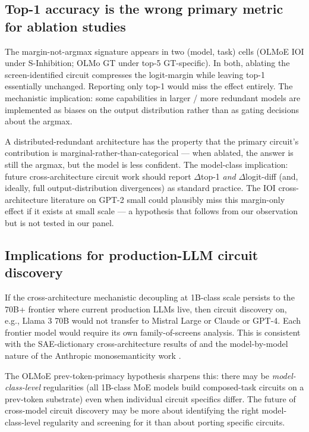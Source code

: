 \documentclass[11pt]{article}
\begin{document}
\subsection{Top-1 accuracy is the wrong primary metric for ablation studies}

The margin-not-argmax signature appears in two (model, task) cells (OLMoE IOI under S-Inhibition; OLMo GT under top-5 GT-specific). In both, ablating the screen-identified circuit compresses the logit-margin while leaving top-1 essentially unchanged. Reporting only top-1 would miss the effect entirely. The mechanistic implication: some capabilities in larger / more redundant models are implemented as biases on the output distribution rather than as gating decisions about the argmax.

A distributed-redundant architecture has the property that the primary circuit's contribution is marginal-rather-than-categorical --- when ablated, the answer is still the argmax, but the model is less confident. The model-class implication: future cross-architecture circuit work should report $\Delta$top-1 \emph{and} $\Delta$logit-diff (and, ideally, full output-distribution divergences) as standard practice. The IOI cross-architecture literature on GPT-2 small could plausibly miss this margin-only effect if it exists at small scale --- a hypothesis that follows from our observation but is not tested in our panel.

\subsection{Implications for production-LLM circuit discovery}

If the cross-architecture mechanistic decoupling at 1B-class scale persists to the 70B+ frontier where current production LLMs live, then circuit discovery on, e.g., Llama 3 70B would not transfer to Mistral Large or Claude or GPT-4. Each frontier model would require its own family-of-screens analysis. This is consistent with the SAE-dictionary cross-architecture results of \citet{marks2024sparsefeature} and the model-by-model nature of the Anthropic monosemanticity work \citep{templeton2024monosemanticity}.

The OLMoE prev-token-primacy hypothesis sharpens this: there may be \emph{model-class-level} regularities (all 1B-class MoE models build composed-task circuits on a prev-token substrate) even when individual circuit specifics differ. The future of cross-model circuit discovery may be more about identifying the right model-class-level regularity and screening for it than about porting specific circuits.
\end{document}
